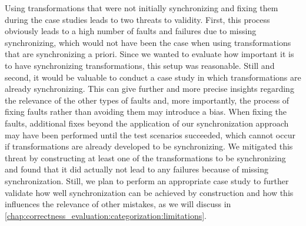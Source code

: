 Using transformations that were not initially synchronizing and fixing them during the case studies leads to two threats to validity. 
First, this process obviously leads to a high number of faults and failures due to missing synchronizing, which would not have been the case when using transformations that are synchronizing a priori.
Since we wanted to evaluate how important it is to have synchronizing transformations, this setup was reasonable.
Still and second, it would be valuable to conduct a case study in which transformations are already synchronizing.
This can give further and more precise insights regarding the relevance of the other types of faults and, more importantly, the process of fixing faults rather than avoiding them may introduce a bias.
When fixing the faults, additional fixes beyond the application of our synchronization approach may have been performed until the test scenarios succeeded, which cannot occur if transformations are already developed to be synchronizing.
We mitigated this threat by constructing at least one of the transformations to be synchronizing and found that it did actually not lead to any failures because of missing synchronization.
Still, we plan to perform an appropriate case study to further validate how well synchronization can be achieved by construction and how this influences the relevance of other mistakes, as we will discuss in \autoref{chap:correctness_evaluation:categorization:limitations}.


